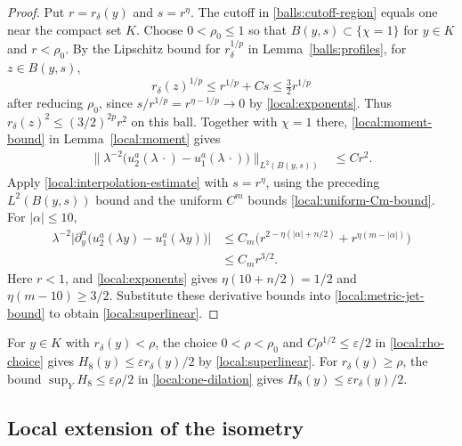 \documentclass[11pt,a4paper]{article}
\theoremstyle{definition}
\theoremstyle{remark}
\numberwithin{equation}{section}
\begin{document}
\begin{proof}
Put $r=r_\delta(y)$ and $s=r^\eta$. The cutoff in
\eqref{balls:cutoff-region} equals one near the compact set $K$.
Choose $0<\rho_0\le1$ so that $B(y,s)\subset\{\chi=1\}$
for $y\in K$ and $r<\rho_0$.
By the Lipschitz bound for $r_\delta^{1/p}$ in
Lemma~\ref{balls:profiles}, for $z\in B(y,s)$,
\[
 r_\delta(z)^{1/p}\le r^{1/p}+Cs\le\tfrac32 r^{1/p}
\]
after reducing $\rho_0$, since $s/r^{1/p}=r^{\eta-1/p}\to0$
by \eqref{local:exponents}. Thus $r_\delta(z)^2\le(3/2)^{2p}r^2$
on this ball. Together with $\chi=1$ there,
\eqref{local:moment-bound} in Lemma~\ref{local:moment} gives
\begin{align*}
 \bigl\|\lambda^{-2}\bigl(u_2^a(\lambda\,\cdot)
                   -u_1^a(\lambda\,\cdot)\bigr)\bigr\|_{L^2(B(y,s))}
 &\le Cr^2.
\end{align*}
Apply \eqref{local:interpolation-estimate} with $s=r^\eta$, using
the preceding $L^2(B(y,s))$ bound and the uniform $C^m$ bounds
\eqref{local:uniform-Cm-bound}. For $|\alpha|\le10$,
\begin{align*}
 \lambda^{-2}\bigl|\partial_y^\alpha
       \bigl(u_2^a(\lambda y)-u_1^a(\lambda y)\bigr)\bigr|
 &\le C_m\bigl(r^{2-\eta(|\alpha|+n/2)}+r^{\eta(m-|\alpha|)}\bigr)\\
 &\le C_m r^{3/2}.
\end{align*}
Here $r<1$, and \eqref{local:exponents} gives
$\eta(10+n/2)=1/2$ and $\eta(m-10)\ge3/2$.
Substitute these derivative bounds into
\eqref{local:metric-jet-bound} to obtain \eqref{local:superlinear}.
\end{proof}

For $y\in K$ with $r_\delta(y)<\rho$, the choice
$0<\rho<\rho_0$ and $C\rho^{1/2}\le\varepsilon/2$ in
\eqref{local:rho-choice} gives $H_8(y)\le\varepsilon r_\delta(y)/2$
by \eqref{local:superlinear}. For $r_\delta(y)\ge\rho$, the bound
$\sup_Y H_8\le\varepsilon\rho/2$ in \eqref{local:one-dilation}
gives $H_8(y)\le\varepsilon r_\delta(y)/2$.

\subsection{Local extension of the isometry}
\end{document}
